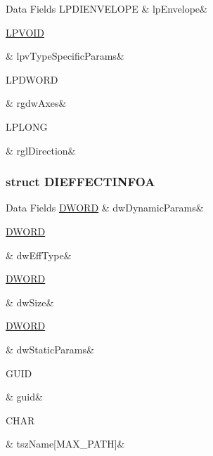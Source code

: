 \begin{DoxyFields}{Data Fields}
\hypertarget{a00003_aeaa5ded44711a1ab7389a50398409257}{L\-P\-D\-I\-E\-N\-V\-E\-L\-O\-P\-E}\label{a00003_aeaa5ded44711a1ab7389a50398409257}
&
lp\-Envelope&
\\
\hline

\hypertarget{a00003_a572a543576acf167d723bb3142294829}{\hyperlink{a00003_ae611cd6871649dbfe37273a0253d5e61}{L\-P\-V\-O\-I\-D}}\label{a00003_a572a543576acf167d723bb3142294829}
&
lpv\-Type\-Specific\-Params&
\\
\hline

\hypertarget{a00003_aedfe5b9ab695e3587226f7f17e96f133}{L\-P\-D\-W\-O\-R\-D}\label{a00003_aedfe5b9ab695e3587226f7f17e96f133}
&
rgdw\-Axes&
\\
\hline

\hypertarget{a00003_a200e86194693b7b818ccc0f892292e31}{L\-P\-L\-O\-N\-G}\label{a00003_a200e86194693b7b818ccc0f892292e31}
&
rgl\-Direction&
\\
\hline

\end{DoxyFields}
\label{df/d5d/a00084}
\hypertarget{a00003_df/d5d/a00084}{}
\subsubsection{struct D\-I\-E\-F\-F\-E\-C\-T\-I\-N\-F\-O\-A}
\begin{DoxyFields}{Data Fields}
\hypertarget{a00003_a5960d079753d3d096fda2e06cde63909}{\hyperlink{a00003_a50e15ae51c87ae06ab29c8148cb5f36c}{D\-W\-O\-R\-D}}\label{a00003_a5960d079753d3d096fda2e06cde63909}
&
dw\-Dynamic\-Params&
\\
\hline

\hypertarget{a00003_a86d5a8965ff03b83984c7906513d9efc}{\hyperlink{a00003_a50e15ae51c87ae06ab29c8148cb5f36c}{D\-W\-O\-R\-D}}\label{a00003_a86d5a8965ff03b83984c7906513d9efc}
&
dw\-Eff\-Type&
\\
\hline

\hypertarget{a00003_a669c5a85f5a9eb97e64ad880fadaaa2d}{\hyperlink{a00003_a50e15ae51c87ae06ab29c8148cb5f36c}{D\-W\-O\-R\-D}}\label{a00003_a669c5a85f5a9eb97e64ad880fadaaa2d}
&
dw\-Size&
\\
\hline

\hypertarget{a00003_ac14d49a005b6a47ff12cfa947c1bc413}{\hyperlink{a00003_a50e15ae51c87ae06ab29c8148cb5f36c}{D\-W\-O\-R\-D}}\label{a00003_ac14d49a005b6a47ff12cfa947c1bc413}
&
dw\-Static\-Params&
\\
\hline

\hypertarget{a00003_a251f3e458e214b6e3ffde1171e658f78}{G\-U\-I\-D}\label{a00003_a251f3e458e214b6e3ffde1171e658f78}
&
guid&
\\
\hline

\hypertarget{a00003_a4b0a3dc31e4378c7de85eaa6654bcabb}{C\-H\-A\-R}\label{a00003_a4b0a3dc31e4378c7de85eaa6654bcabb}
&
tsz\-Name\mbox{[}M\-A\-X\-\_\-\-P\-A\-T\-H\mbox{]}&
\\
\hline

\end{DoxyFields}
\label{df/d13/a00085}
\hypertarget{a00003_df/d13/a00085}{}
